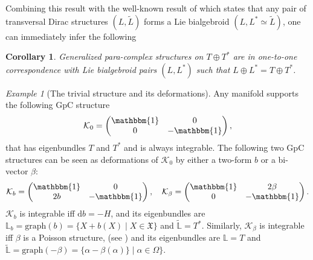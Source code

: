 \documentclass{article}
\newcommand{\TT}{{T\oplus T^*}}
\newcommand{\KK}{\mathcal{K}}
\newcommand{\XX}{\mathfrak{X}}
\newcommand{\id}{\mathbbm{1}}
\newcommand{\ap}{\alpha}
\newcommand{\rd}{\mathrm{d}}
\newcommand{\Lt}{\tl{L}}
\newcommand{\Lb}{\mathbb{L}}
\def\tl{\tilde}
\newtheorem{corollary}[theorem]{Corollary}
\theoremstyle{definition}
\theoremstyle{remark}
\newtheorem{Ex}[theorem]{Example}
\begin{document}
Combining this result with the well-known result of \cite{Liu:1995lsa} which states that any pair of transversal Dirac structures $(L,\Lt)$ forms a Lie bialgebroid $(L,L^*\simeq \Lt)$, one can immediately infer the following

\begin{corollary}
Generalized para-complex structures on $\TT$ are in one-to-one correspondence with Lie bialgebroid pairs $(L,L^*)$ such that $L\oplus L^*=\TT$. 
\end{corollary}


\begin{Ex}[The trivial structure and its deformations]\label{ex:GpC_trivial}
Any manifold supports the following GpC structure
\begin{align*}
\KK_0=
\begin{pmatrix}
\id & 0 \\
0 & -\id
\end{pmatrix},
\end{align*}
that has eigenbundles $T$ and $T^*$ and is always integrable. The following two GpC structures can be seen as deformations of $\KK_0$ by either a two-form $b$ or a bi-vector $\beta$:
\begin{align*}
\KK_b=
\begin{pmatrix}
\id & 0 \\
2b & -\id
\end{pmatrix},\quad
\KK_\beta=
\begin{pmatrix}
\id & 2\beta \\
0 & -\id
\end{pmatrix}.
\end{align*}
$\KK_b$ is integrable iff $\rd b =-H$, and its eigenbundles are $\Lb_b=\text{graph}(b)=\{X+b(X)\mid X \in \XX\}$ and $\widetilde{\Lb}=T^*$. Similarly, $\KK_\beta$ is integrable iff $\beta$ is a Poisson structure, (see \cite[Lemma~2.13]{Hu:2019zro}) and its eigenbundles are $\Lb=T$ and $\widetilde{\Lb}=\text{graph}(-\beta)=\{\ap-\beta(\ap)\}\mid \ap \in \Omega\}$.
\end{Ex}
\end{document}
